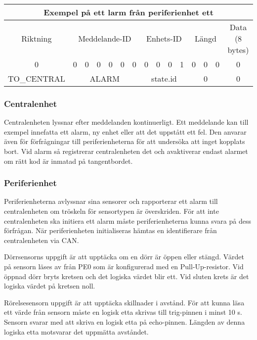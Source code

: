 \documentclass[a4paper]{article}
\begin{document}
\begin{table}[H]
    \centering
    \begin{tabular}{|c|c|c|c|c|c|c|c|c|c|c|c|c|c|c|}\hline
        \multicolumn{15}{|c|}{Exempel på ett larm från periferienhet ett}\\\hline
        \multicolumn{1}{|c|}{Riktning} & \multicolumn{6}{|c|}{Meddelande-ID} & \multicolumn{4}{|c|}{Enhets-ID} & \multicolumn{3}{|c|}{Längd} & \multicolumn{1}{|c|}{Data (8 bytes)} \\\hline
        0 & 0 & 0 & 0 & 0 & 0 & 0 & 0 & 0 & 0 & 1 & 0 & 0 & 0 & 0 \\\hline
        \multicolumn{1}{|c|}{TO\_CENTRAL} & \multicolumn{6}{|c|}{ALARM} & \multicolumn{4}{|c|}{state.id} & \multicolumn{3}{|c|}{0} & \multicolumn{1}{|c|}{0} \\\hline
    \end{tabular}
\end{table}

\subsubsection{Centralenhet}
Centralenheten lyssnar efter meddelanden kontinuerligt.
Ett meddelande kan till exempel innefatta ett alarm, ny enhet eller att det uppstått ett fel.
Den anvarar även för förfrågningar till periferienheterna för att undersöka att inget kopplats bort.
Vid alarm så registrerar centralenheten det och avaktiverar endast alarmet om rätt kod är inmatad på tangentbordet.

\subsubsection{Periferienhet}
Periferienheterna avlyssnar sina sensorer och rapporterar ett alarm till centralenheten om tröskeln för sensortypen är överskriden.
För att inte centralenheten ska initiera ett alarm måste periferienheterna kunna svara på dess förfrågan.
När periferienheten initialiseras hämtas en identifierare från centralenheten via CAN.

Dörrsensorns uppgift är att upptäcka om en dörr är öppen eller stängd.
Värdet på sensorn läses av från PE0 som är konfigurerad med en Pull-Up-resistor.
Vid öppnad dörr bryts kretsen och det logiska värdet blir ett.
Vid sluten krets är det logiska värdet på kretsen noll.

Rörelsesensorn uppgift är att upptäcka skillnader i avstånd.
För att kunna läsa ett värde från sensorn måste en logisk etta skrivas till trig-pinnen i minst 10 \textmu s.
Sensorn svarar med att skriva en logisk etta på echo-pinnen.
Längden av denna logiska etta motsvarar det uppmätta avståndet.
\end{document}
